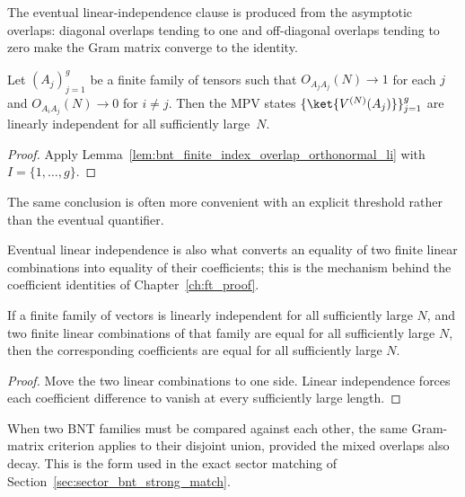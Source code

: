 The eventual linear-independence clause is produced from the asymptotic
overlaps: diagonal overlaps tending to one and off-diagonal overlaps tending to
zero make the Gram matrix converge to the identity.



\begin{lemma}
    \label{lem:bnt_overlap_orthonormal_li}
    \leanok
    Let $(A_j)_{j=1}^g$ be a finite family of tensors such that
    $O_{A_jA_j}(N) \to 1$ for each $j$ and $O_{A_iA_j}(N) \to 0$
    for $i \neq j$. Then the MPV states
    $\{\ket{V^{(N)}(A_j)}\}_{j=1}^g$ are linearly independent for all
    sufficiently large~$N$.
\end{lemma}

\begin{proof}\leanok
    Apply Lemma~\ref{lem:bnt_finite_index_overlap_orthonormal_li} with
    $I = \{1,\ldots,g\}$.
\end{proof}

The same conclusion is often more convenient with an explicit threshold rather
than the eventual quantifier.



Eventual linear independence is also what converts an equality of two finite
linear combinations into equality of their coefficients; this is the mechanism
behind the coefficient identities of Chapter~\ref{ch:ft_proof}.

\begin{lemma}%
    \label{lem:eventual_coeff_eq_of_eventual_li}
    \leanok
    If a finite family of vectors is linearly independent for all sufficiently
    large $N$, and two finite linear combinations of that family are equal
    for all sufficiently large $N$, then the corresponding coefficients are
    equal for all sufficiently large $N$.
\end{lemma}

\begin{proof}\leanok
    Move the two linear combinations to one side. Linear independence forces
    each coefficient difference to vanish at every sufficiently large length.
\end{proof}

When two BNT families must be compared against each other, the same
Gram-matrix criterion applies to their disjoint union, provided the mixed
overlaps also decay. This is the form used in the exact sector matching of
Section~\ref{sec:sector_bnt_strong_match}.



